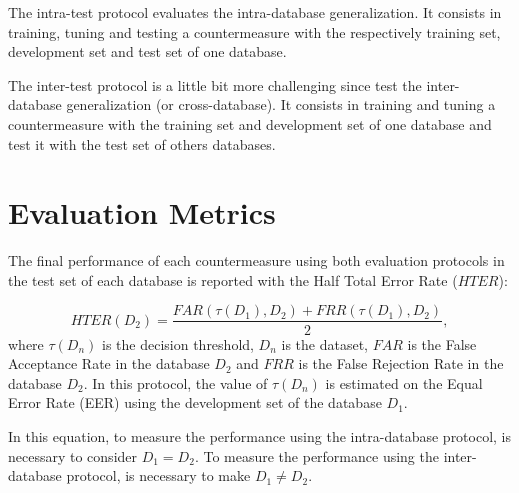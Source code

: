 The intra-test protocol evaluates the intra-database generalization. It consists in training, tuning and testing a countermeasure with the respectively training set, development set and test set of one database.

The inter-test protocol is a little bit more challenging since test the inter-database generalization (or cross-database). It consists in training and tuning a countermeasure with the training set and development set of one database and test it with the test set of others databases. 






\section{Evaluation Metrics}

The final performance of each countermeasure using both evaluation protocols in the test set of each database is reported with the Half Total Error Rate ($HTER$): 

\begin{equation}
\label{eq:HTER}
HTER(D_2)=\frac{FAR(\tau(D_1),D_2)+ FRR(\tau(D_1),D_2)} {2} ,
\end{equation}
where $\tau(D_n)$ is the decision threshold, $D_n$ is the dataset, $FAR$ is the False Acceptance Rate in the database $D_2$ and $FRR$ is the False Rejection Rate in the database $D_2$. In this protocol, the value of $\tau(D_n)$ is estimated on the Equal Error Rate (EER) using the development set of the database $D_1$. 

In this equation, to measure the performance using the intra-database protocol, is necessary to consider $D_1 = D_2$. To measure the performance using the inter-database protocol, is necessary to make $D_1 \neq D_2$.


